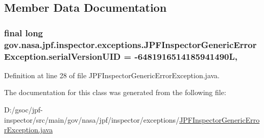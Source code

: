 \subsection{Member Data Documentation}
\subsubsection[{\texorpdfstring{serial\+Version\+U\+ID}{serialVersionUID}}]{\setlength{\rightskip}{0pt plus 5cm}final long gov.\+nasa.\+jpf.\+inspector.\+exceptions.\+J\+P\+F\+Inspector\+Generic\+Error\+Exception.\+serial\+Version\+U\+ID = -\/6481916514185941490L\hspace{0.3cm}{\ttfamily [static]}, {\ttfamily [private]}}\hypertarget{classgov_1_1nasa_1_1jpf_1_1inspector_1_1exceptions_1_1_j_p_f_inspector_generic_error_exception_a4e9f676355c139d6d71fca9bd5770b44}{}\label{classgov_1_1nasa_1_1jpf_1_1inspector_1_1exceptions_1_1_j_p_f_inspector_generic_error_exception_a4e9f676355c139d6d71fca9bd5770b44}


Definition at line 28 of file J\+P\+F\+Inspector\+Generic\+Error\+Exception.\+java.



The documentation for this class was generated from the following file\+:\begin{DoxyCompactItemize}
\item 
D\+:/gsoc/jpf-\/inspector/src/main/gov/nasa/jpf/inspector/exceptions/\hyperlink{_j_p_f_inspector_generic_error_exception_8java}{J\+P\+F\+Inspector\+Generic\+Error\+Exception.\+java}\end{DoxyCompactItemize}
